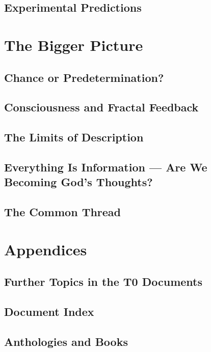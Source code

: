\documentclass[11pt,twoside,openright]{book}
\begin{document}
\chapter{Experimental Predictions}\label{ch:exp}


\part{The Bigger Picture}

\chapter{Chance or Predetermination?}\label{ch:determinismus}


\chapter{Consciousness and Fractal Feedback}\label{ch:bewusstsein}


\chapter{The Limits of Description}\label{ch:epilog}


\chapter{Everything Is Information --- Are We Becoming God's Thoughts?}


\chapter{The Common Thread}\label{ch:zusammenfassung}


\backmatter

\appendix
\part*{Appendices}

\chapter{Further Topics in the T0 Documents}


\chapter{Document Index}\label{ch:dokverz}


\chapter{Anthologies and Books}

\end{document}
